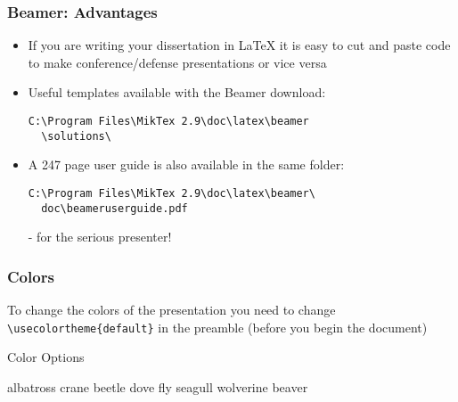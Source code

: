 \documentclass{beamer}
\begin{document}
\begin{frame}[fragile]
  \frametitle{Beamer: Advantages}
  \begin{itemize}
  \item If you are writing your dissertation in LaTeX it is easy to cut and paste code to make conference/defense presentations or vice versa
  \item Useful templates available with the Beamer download:
  \begin{verbatim}C:\Program Files\MikTex 2.9\doc\latex\beamer
  \solutions\ \end{verbatim}
  \item A 247 page user guide is also available in the same folder:
  \begin{verbatim}C:\Program Files\MikTex 2.9\doc\latex\beamer\
  doc\beameruserguide.pdf\end{verbatim} - for the serious presenter!
  \end{itemize}
\end{frame}



\begin{frame}[fragile]
  \frametitle{Colors}
 To change the colors of the presentation you need to change
 \verb|\usecolortheme{default}| in the preamble (before you begin the document)
 \begin{block}{Color Options}
 \begin{center}
 albatross crane beetle dove fly seagull wolverine beaver
 \end{center}
\end{block}
\end{frame}
\end{document}
